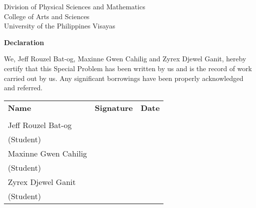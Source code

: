 \begin{center}
	Division of Physical Sciences and Mathematics\\
	College of Arts and Sciences\\
	University of the Philippines Visayas 
	
		\textbf{Declaration}
		\end{center}

We,  Jeff Rouzel Bat-og, Maxinne Gwen Cahilig and Zyrex Djewel Ganit, hereby certify that this Special Problem has been written by us  and is the record of work carried out by us. Any significant borrowings have been properly acknowledged and referred.

	\begin{tabular}{lll}
	\bfseries Name  & \bfseries Signature & \bfseries Date\\ \\
	Jeff Rouzel Bat-og &\signaturerule  & \signaturerule\\ 
	\multicolumn{1}{l}{(Student)} \\ 
	Maxinne Gwen Cahilig &\signaturerule  & \signaturerule\\ 
	\multicolumn{1}{l}{(Student)} \\
	Zyrex Djewel Ganit &\signaturerule  & \signaturerule\\ 
\multicolumn{1}{l}{(Student)} \\

\end{tabular}



